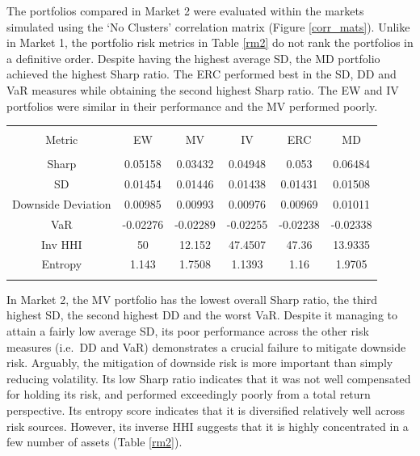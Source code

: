 \documentclass[11pt,preprint, authoryear]{elsarticle}
\let\origtable\table
\let\endorigtable\endtable
\renewenvironment{table}[1][2] {
    \expandafter\origtable\expandafter[H]
} {
    \endorigtable
}
\numberwithin{equation}{section}
\numberwithin{figure}{section}
\numberwithin{table}{section}
\begin{document}
The portfolios compared in Market 2 were evaluated within the markets
simulated using the `No Clusters' correlation matrix (Figure
\ref{corr_mats}). Unlike in Market 1, the portfolio risk metrics in
Table \ref{rm2} do not rank the portfolios in a definitive order.
Despite having the highest average SD, the MD portfolio achieved the
highest Sharp ratio. The ERC performed best in the SD, DD and VaR
measures while obtaining the second highest Sharp ratio. The EW and IV
portfolios were similar in their performance and the MV performed
poorly.

\begin{table}[!htbp] \centering 
  \caption{Market 2 - Portfolio Risk Metrics} 
  \label{rm2} 
\begin{tabular}{@{\extracolsep{5pt}} cccccc} 
\\[-1.8ex]\hline 
\hline \\[-1.8ex] 
Metric & EW & MV & IV & ERC & MD \\ 
\hline \\[-1.8ex] 
Sharp & 0.05158 & 0.03432 & 0.04948 & 0.053 & 0.06484 \\ 
SD & 0.01454 & 0.01446 & 0.01438 & 0.01431 & 0.01508 \\ 
Downside Deviation & 0.00985 & 0.00993 & 0.00976 & 0.00969 & 0.01011 \\ 
VaR & -0.02276 & -0.02289 & -0.02255 & -0.02238 & -0.02338 \\ 
Inv HHI & 50 & 12.152 & 47.4507 & 47.36 & 13.9335 \\ 
Entropy & 1.143 & 1.7508 & 1.1393 & 1.16 & 1.9705 \\ 
\hline \\[-1.8ex] 
\end{tabular} 
\end{table}

In Market 2, the MV portfolio has the lowest overall Sharp ratio, the
third highest SD, the second highest DD and the worst VaR. Despite it
managing to attain a fairly low average SD, its poor performance across
the other risk measures (i.e.~DD and VaR) demonstrates a crucial failure
to mitigate downside risk. Arguably, the mitigation of downside risk is
more important than simply reducing volatility. Its low Sharp ratio
indicates that it was not well compensated for holding its risk, and
performed exceedingly poorly from a total return perspective. Its
entropy score indicates that it is diversified relatively well across
risk sources. However, its inverse HHI suggests that it is highly
concentrated in a few number of assets (Table \ref{rm2}).
\end{document}
